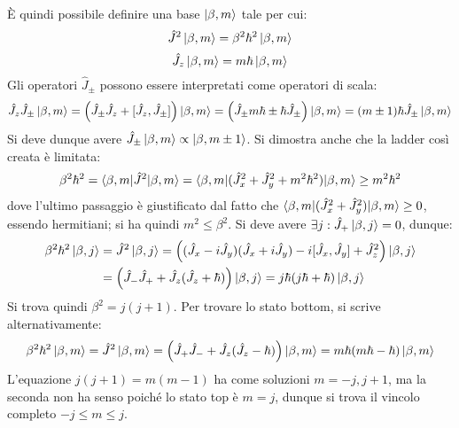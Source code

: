 È quindi possibile definire una base $ \ket{\beta,m} $ tale per cui:
\begin{equation}
	\hat{J}^2 \ket{\beta,m} = \beta^2 \hbar^2 \ket{\beta,m}
	\label{eq:9.19}
\end{equation}
\begin{equation}
	\hat{J}_z \ket{\beta,m} = m \hbar \ket{\beta,m}
	\label{eq:9.20}
\end{equation}
Gli operatori $ \hat{J}_{\pm} $ possono essere interpretati come operatori di scala:
\begin{equation*}
	\hat{J}_z \hat{J}_{\pm} \ket{\beta,m} = \left( \hat{J}_{\pm} \hat{J}_z + [\hat{J}_z, \hat{J}_{\pm}] \right) \ket{\beta,m} = \left( \hat{J}_{\pm} m\hbar \pm \hbar \hat{J}_{\pm} \right) \ket{\beta,m} = (m \pm 1) \hbar \hat{J}_{\pm} \ket{\beta,m}
\end{equation*}
Si deve dunque avere $ \hat{J}_{\pm} \ket{\beta,m} \propto \ket{\beta,m \pm 1} $. Si dimostra anche che la ladder così creata è limitata:
\begin{equation*}
	\beta^2 \hbar^2 = \braket{\beta,m | \hat{J}^2 | \beta,m} = \braket{\beta,m | ( \hat{J}_x^2 + \hat{J}_y^2 + m^2 \hbar^2 ) | \beta,m} \ge m^2 \hbar^2
\end{equation*}
dove l'ultimo passaggio è giustificato dal fatto che $ \braket{\beta,m | (\hat{J}_x^2 + \hat{J}_y^2) | \beta,m} \ge 0 $, essendo hermitiani; si ha quindi $ m^2 \le \beta^2 $. Si deve avere $ \exists j : \hat{J}_+ \ket{\beta,j} = 0 $, dunque:
\begin{equation*}
	\begin{split}
		\beta^2 \hbar^2 \ket{\beta,j}
		&= \hat{J}^2 \ket{\beta,j} = \left( (\hat{J}_x - i \hat{J}_y) (\hat{J}_x + i \hat{J}_y) - i [\hat{J}_x,\hat{J}_y] + \hat{J}_z^2 \right) \ket{\beta,j} \\
		&= \left( \hat{J}_- \hat{J}_+ + \hat{J}_z (\hat{J}_z + \hbar) \right) \ket{\beta,j} = j\hbar (j\hbar + \hbar) \ket{\beta,j}
	\end{split}
\end{equation*}
Si trova quindi $ \beta^2 = j (j + 1) $. Per trovare lo stato bottom, si scrive alternativamente:
\begin{equation*}
	\beta^2 \hbar^2 \ket{\beta,m} = \hat{J}^2 \ket{\beta,m} = \left( \hat{J}_+ \hat{J}_- + \hat{J}_z (\hat{J}_z - \hbar) \right) \ket{\beta,m} = m\hbar (m\hbar - \hbar) \ket{\beta,m}
\end{equation*}
L'equazione $ j(j + 1) = m(m - 1) $ ha come soluzioni $ m = -j, j+1 $, ma la seconda non ha senso poiché lo stato top è $ m = j $, dunque si trova il vincolo completo $ -j \le m \le j $.\\
